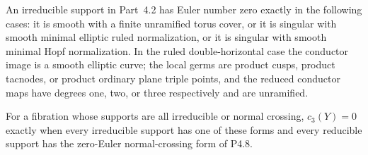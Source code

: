 
\begin{proposition}[P4.32]\hypertarget{tag-02X5}{}\label{night:P4.32}\label{stmt:P4.32}


An irreducible support in Part~4.2 has Euler number zero exactly
in the following cases: it is smooth with a finite unramified
torus cover, or it is singular with smooth minimal elliptic ruled
normalization, or it is singular with smooth minimal Hopf
normalization. In the ruled double-horizontal case the conductor
image is a smooth elliptic curve; the local germs are product
cusps, product tacnodes, or product ordinary plane triple points,
and the reduced conductor maps have degrees one, two, or three
respectively and are unramified.

For a fibration whose supports are all irreducible or normal
crossing, $c_3(Y)=0$ exactly when every irreducible support has
one of these forms and every reducible support has the
zero-Euler normal-crossing form of P4.8.
\end{proposition}

